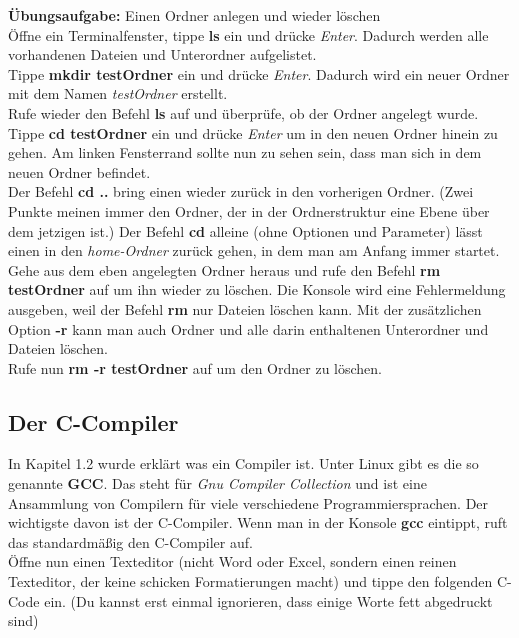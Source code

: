 \documentclass[c_worksheet.tex]{subfiles}
\begin{document}
\textbf{Übungsaufgabe:} Einen Ordner anlegen und wieder löschen\\
Öffne ein Terminalfenster, tippe \textbf{ls} ein und drücke \textit{Enter}. Dadurch werden alle vorhandenen Dateien und Unterordner aufgelistet.\\
Tippe \textbf{mkdir testOrdner} ein und drücke \textit{Enter}. Dadurch wird ein neuer Ordner mit dem Namen \textit{testOrdner} erstellt.\\
Rufe wieder den Befehl \textbf{ls} auf und überprüfe, ob der Ordner angelegt wurde.\\
Tippe \textbf{cd testOrdner} ein und drücke \textit{Enter} um in den neuen Ordner hinein zu gehen. Am linken Fensterrand sollte nun zu sehen sein, dass man sich in dem neuen Ordner befindet.\\
Der Befehl \textbf{cd ..} bring einen wieder zurück in den vorherigen Ordner. (Zwei Punkte meinen immer den Ordner, der in der Ordnerstruktur eine Ebene über dem jetzigen ist.) Der Befehl \textbf{cd} alleine (ohne Optionen und Parameter) lässt einen in den \textit{home-Ordner} zurück gehen, in dem man am Anfang immer startet.\\
Gehe aus dem eben angelegten Ordner heraus und rufe den Befehl \textbf{rm testOrdner} auf um ihn wieder zu löschen. Die Konsole wird eine Fehlermeldung ausgeben, weil der Befehl \textbf{rm} nur Dateien löschen kann. Mit der zusätzlichen Option \textbf{-r} kann man auch Ordner und alle darin enthaltenen Unterordner und Dateien löschen.\\
Rufe nun \textbf{rm -r testOrdner} auf um den Ordner zu löschen.

\newpage
\subsection{Der C-Compiler}

In Kapitel 1.2 wurde erklärt was ein Compiler ist. Unter Linux gibt es die so genannte \textbf{GCC}. Das steht für \textit{Gnu Compiler Collection} und ist eine Ansammlung von Compilern für viele verschiedene Programmiersprachen. Der wichtigste davon ist der C-Compiler. Wenn man in der Konsole \textbf{gcc} eintippt, ruft das standardmäßig den C-Compiler auf.\\

Öffne nun einen Texteditor (nicht Word oder Excel, sondern einen reinen Texteditor, der keine schicken Formatierungen macht) und tippe den folgenden C-Code ein. (Du kannst erst einmal ignorieren, dass einige Worte fett abgedruckt sind)\\
\end{document}

